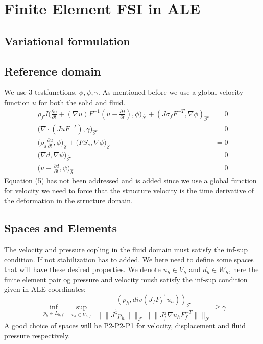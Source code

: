 \section*{Finite Element FSI in ALE}
\subsection*{Variational formulation}
\subsection*{Reference domain}
We use 3 testfunctions, $\phi, \psi, \gamma$. As mentioned before we use a global velocity function $u$ for both the solid and fluid.
\begin{align}
\rho_f J \big( \frac{\partial u}{\partial t} + (\nabla u)F^{-1}(u-\frac{\partial d}{\partial t}) , \phi\big)_{\mathcal{\hat{F}}} + (J\sigma_f F^{-T},\nabla \phi )_{\mathcal{\hat{F}}} &= 0  \\
 \big( \nabla \cdot (J u F^{-T}),\gamma \big)_{\mathcal{\hat{F}}} &= 0 \\
\big(\rho_s \frac{\partial u}{\partial t},\phi \big)_{\mathcal{\hat{S}}} + \big(F S_s, \nabla \phi \big)_{\mathcal{\hat{S}}} &=0 \\
 \big( \nabla d , \nabla \psi \big)_{\mathcal{\hat{F}}} &= 0 \\
 \big( u- \frac{\partial d}{\partial t} ,\psi \big)_{\mathcal{\hat{S}}} &= 0 
\end{align}
Equation (5) has not been addressed and is added since we use a global function for velocity we need to force that the structure velocity is the time derivative of the deformation in the structure domain. 

\subsection*{Spaces and Elements}
The velocity and pressure copling in the fluid domain must satisfy the inf-sup condition. If not stabilization has to added. We here need to define some spaces that will have these desired properties.
We denote $u_h \in V_h$ and $ d_h \in W_h $, here the finite element pair og pressure and velocity mush satisfy the inf-sup condition given in ALE coordinates:
$$   \inf_{\substack{p_h \in L_{h,f}}}  \sup_{\substack{v_h \in V_{h,f}}} \frac{ (p_h, div(J_f F_f^{-1} u_h))_{\mathcal{F}} }{ \|\|J^{\frac{1}{2}} p_h  \|\|_{\mathcal{F}} \|\|  J^{\frac{1}{2}}_{f} \nabla u_h F_f^{-T} \|\|_{\mathcal{F}}  } \geq \gamma     $$
A good choice of spaces will be P2-P2-P1 for velocity, displacement and fluid pressure respectively. 








